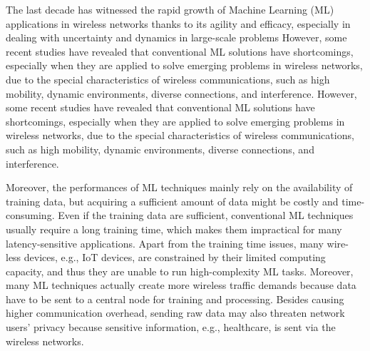 \documentclass[letterpaper%
, oneside%
, 12pt%
,thesepararticles%
, english%
,creativecommons,hyperref, withAlgo2e%
]{thETS}
\begin{document}
\begin{introduction}

The last decade has witnessed the rapid growth of Machine Learning (ML) applications in wireless networks thanks to its agility and efficacy, especially in dealing with uncertainty and dynamics in large-scale problems
    \cite{8743390} \cite{6336689}
However, some recent studies have revealed that conventional ML solutions have shortcomings, especially when they are applied to solve emerging problems in wireless networks, due to the special characteristics of wireless communications, such as high mobility, dynamic environments, diverse connections, and interference. However, some recent studies have revealed that conventional ML solutions have shortcomings, especially when they are applied to solve emerging problems in wireless networks, due to the special characteristics of wireless communications, such as high mobility, dynamic environments, diverse connections, and interference.

Moreover, the performances of ML techniques mainly rely on the availability of training data, but acquiring a sufficient amount of data might be costly and time-consuming. Even if the training data are sufficient, conventional ML techniques usually require a long training time, which makes them impractical for many latency-sensitive applications. Apart from the training time issues, many wire- less devices, e.g., IoT devices, are constrained by their limited computing capacity, and thus they are unable to run high-complexity ML tasks. Moreover, many ML techniques actually create more wireless traffic demands because data have to be sent to a central node for training and processing. Besides causing higher communication overhead, sending raw data may also threaten network users' privacy because sensitive information, e.g., healthcare, is sent via the wireless networks.


\end{introduction}
\end{document}
